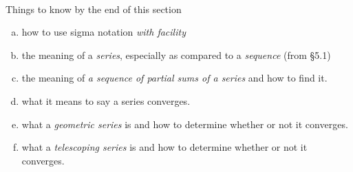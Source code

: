 \documentclass[11pt,fleqn]{article}
\begin{document}
\renewcommand{\headrulewidth}{0pt}
\newcommand{\blank}[1]{\rule{#1}{0.75pt}}
\newcommand{\bc}{\begin{center}}
\newcommand{\ec}{\end{center}}


\vspace*{-0.7in}

\begin{center}
  \large
  \\
   
\end{center}


Things to know by the end of this section
\begin{multicols}{2}
	\begin{enumerate}[a.]
	\item how to use sigma notation \emph{with facility}
	\item the meaning of a \emph{series}, especially as compared to a \emph{sequence} (from \S 5.1)
	\item the meaning of \emph{a sequence of partial sums of a series} and how to find it.
	\item what it means to say a series converges.
	\item what a \emph{geometric series} is and how to determine whether or not it converges.
	\item what a \emph{telescoping series} is and how to determine whether or not it converges.	
	\end{enumerate}
\end{multicols}
\end{document}
